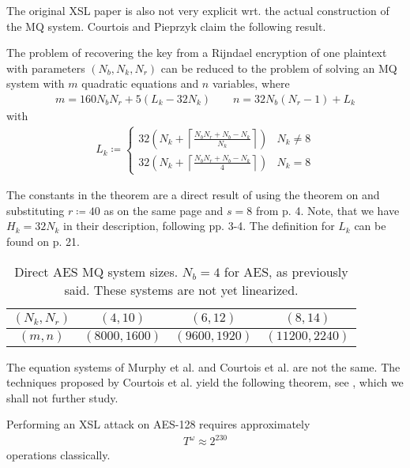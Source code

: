 The original XSL paper is also not very explicit wrt. the actual construction of the MQ system. Courtois and Pieprzyk claim the following result.

\begin{theorem}
    The problem of recovering the key from a Rijndael encryption of one plaintext with parameters \((N_b, N_k, N_r)\) can be reduced to the problem of solving an MQ system with \(m\) quadratic equations and \(n\) variables, where
    \begin{align}
        m = 160N_bN_r + 5(L_k-32N_k) \qquad n = 32N_b(N_r-1)+L_k
    \end{align}
    with
    \begin{align}
        L_k \coloneqq \begin{cases}
            32\left(N_k+\left\lceil\frac{N_bN_r+N_b-N_k}{N_k}\right\rceil\right) & N_k \neq 8\\
            32\left(N_k+\left\lceil\frac{N_bN_r+N_b-N_k}{4}\right\rceil\right) & N_k = 8
        \end{cases}
    \end{align}
\end{theorem}

The constants in the theorem are a direct result of using the theorem on \cite[p. 22]{Courtois2002} and substituting \(r \coloneqq 40\) as on the same page and \(s = 8\) from p. 4. Note, that we have \(H_k = 32N_k\) in their description, following pp. 3-4. The definition for \(L_k\) can be found on p. 21.

\begin{table}[!hbtp]
    \centering
    \begin{tabular}{|c|c|c|c|}
        \hline
        \((N_k, N_r)\) & \((4, 10)\) & \((6, 12)\) & \((8, 14)\)\\ \hline
        \((m, n)\) & \((8000, 1600)\) & \((9600, 1920)\) & \((11200, 2240)\)\\ \hline
    \end{tabular}
    \caption{Direct AES MQ system sizes. \(N_b = 4\) for AES, as previously said. These systems are not yet linearized.}
    \label{direct_aes_mq_system_sizes}
\end{table}

The equation systems of Murphy et al. and Courtois et al. are not the same. The techniques proposed by Courtois et al. yield the following theorem, see \cite[p. 13]{Courtois2002}, which we shall not further study.

\begin{theorem}
    Performing an XSL attack on AES-128 requires approximately
    \begin{align}
        T^\omega \approx 2^{230}
    \end{align}
    operations classically.
\end{theorem}

